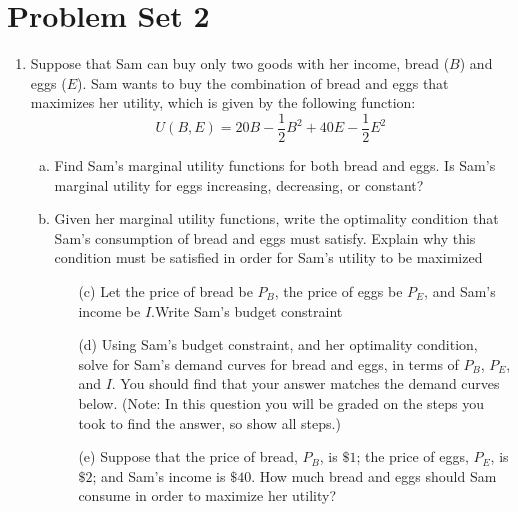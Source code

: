 \documentclass[11pt]{article}
\begin{document}
  
\section*{Problem Set 2}

\begin{enumerate}
  \item Suppose that Sam can buy only two goods with her income, bread ($B$) and eggs ($E$). Sam wants to buy the combination of bread and eggs that maximizes her utility, which is given by the following function:
  $$ 
    U(B,E) = 20B - \frac{1}{2} B^2 + 40E - \frac{1}{2} E^2
  $$

  \begin{enumerate}[(a)]
    \item Find Sam's marginal utility functions for both bread and eggs. Is Sam's marginal utility for eggs increasing, decreasing, or constant?
    

    \vspace*{80mm}
    \item Given her marginal utility functions, write the optimality condition that Sam's consumption of bread and eggs must satisfy. Explain why this condition must be satisfied in order for Sam's utility to be maximized
  
  \end{enumerate}

  
\newpage

\begin{enumerate}
  \item[] 
  \begin{enumerate}[(a)] 
    \item[(c)] Let the price of bread be $P_B$, the price of eggs be $P_E$, and Sam's income be $I$.Write Sam's budget constraint

    \vspace*{90mm}
    \item[(d)] Using Sam's budget constraint, and her optimality condition, solve for Sam's demand curves for bread and eggs, in terms of $P_B$, $P_E$, and $I$. You should find that your answer matches the demand curves below. (Note: In this question you will be graded on the steps you took to find the answer, so show all steps.)
    
    \newpage
    \item[(e)] Suppose that the price of bread, $P_B$, is $\$1$; the price of eggs, $P_E$, is $\$2$; and Sam's income is $\$40$. How much bread and eggs should Sam consume in order to maximize her utility?
    

\end{enumerate}
\end{enumerate}
\end{enumerate}
\end{document}
